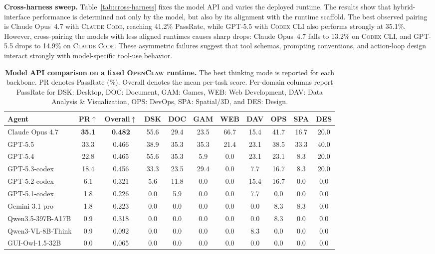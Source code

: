 \documentclass{llmxive}
\providecommand{\arraystretch}{1.2}
\begin{document}
\smallskip
\noindent\textbf{Cross-harness sweep.}
Table~\ref{tab:cross-harness} fixes the model API and varies the deployed runtime. The results show that hybrid-interface performance is determined not only by the model, but also by its alignment with the runtime scaffold. The best observed pairing is Claude Opus~4.7 with \textsc{Claude Code}, reaching 41.2\% PassRate, while GPT-5.5 with \textsc{Codex CLI} also performs strongly at 35.1\%. However, cross-pairing the models with less aligned runtimes causes sharp drops: Claude Opus~4.7 falls to 13.2\% on \textsc{Codex CLI}, and GPT-5.5 drops to 14.9\% on \textsc{Claude Code}. These asymmetric failures suggest that tool schemas, prompting conventions, and action-loop design interact strongly with model-specific tool-use behavior.

\begin{table}[t]
\centering
\footnotesize
\setlength{\tabcolsep}{5pt}
\renewcommand{\arraystretch}{1.2}
\begin{tabular}{l cc | cccccccc}
\toprule
\textbf{Agent} & \textbf{PR}$\uparrow$ & \textbf{Overall}$\uparrow$ & \textbf{DSK} & \textbf{DOC} & \textbf{GAM} & \textbf{WEB} & \textbf{DAV} & \textbf{OPS} & \textbf{SPA} & \textbf{DES} \\
\midrule
Claude Opus 4.7      & \textbf{35.1} & \textbf{0.482} & 55.6 & 29.4 & 23.5 & 66.7 & 15.4 & 41.7 & 16.7 & 20.0 \\
GPT-5.5              & 33.3          & 0.466          & 38.9 & 35.3 & 35.3 & 21.4 & 23.1 & 38.5 & 33.3 & 40.0 \\
GPT-5.4              & 22.8          & 0.465          & 55.6 & 35.3 &  5.9 &  0.0 & 23.1 & 23.1 &  8.3 & 20.0 \\
GPT-5.3-codex        & 18.4          & 0.456          & 33.3 & 23.5 & 29.4 &  0.0 &  7.7 & 16.7 &  8.3 & 20.0 \\
GPT-5.2-codex        &  6.1          & 0.321          &  5.6 & 11.8 &  0.0 &  0.0 & 15.4 & 16.7 &  0.0 &  0.0 \\
GPT-5.1-codex        &  1.8          & 0.226          &  0.0 &  5.9 &  0.0 &  0.0 &  7.7 &  0.0 &  0.0 &  0.0 \\
Gemini 3.1 pro       &  1.8          & 0.223          &  0.0 &  0.0 &  0.0 &  0.0 &  0.0 &  8.3 &  8.3 &  0.0 \\
Qwen3.5-397B-A17B    &  0.9          & 0.318          &  0.0 &  0.0 &  0.0 &  0.0 &  0.0 &  8.3 &  0.0 &  0.0 \\
Qwen3-VL-8B-Think    &  0.9          & 0.092          &  0.0 &  0.0 &  0.0 &  0.0 &  8.3 &  0.0 &  0.0 &  0.0 \\
GUI-Owl-1.5-32B      &  0.0          & 0.065          &  0.0 &  0.0 &  0.0 &  0.0 &  0.0 &  0.0 &  0.0 &  0.0 \\
\bottomrule
\end{tabular}
\caption{\textbf{Model API comparison on a fixed \textsc{OpenClaw} runtime.}
The best thinking mode is reported for each backbone. PR denotes PassRate (\%). Overall denotes the mean per-task score. Per-domain columns report PassRate for DSK: Desktop, DOC: Document, GAM: Games, WEB: Web Development, DAV: Data Analysis \& Visualization, OPS: DevOps, SPA: Spatial/3D, and DES: Design.}
\label{tab:main}
\end{table}
\end{document}
